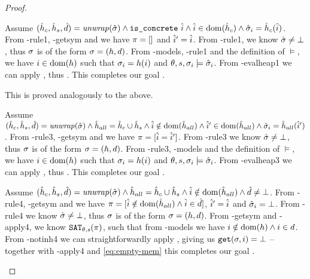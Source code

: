 \begin{proof}
\begin{hypvlist}
 Assume $(\hat{h}_c,\hat{h}_s,\hat{d})=\mathit{unwrap}(\hat{\sigma}) \land \texttt{is\_concrete}~\hat{i} \land \hat{i}\in\operatorname{dom}(\hat{h}_c) \land \hat{\sigma}_{i}=\hat{h}_c(\hat{i})$.
 From \hyp{rule1}, \hyp{getsym} and  we have $\pi=[]$ and $\hat{i}'=\hat{i}$.
 From \hyp{rule1}, we know $\hat{\sigma}\neq\bot$, thus $\sigma$ is of the form $\sigma=(h,d)$.
 From \hyp{models}, \hyp{rule1} and the definition of $\models$, we have $i\in \operatorname{dom}(h)$ such that $\sigma_i=h(i)$ and ${\theta,s,\sigma_i\models\hat{\sigma}_i}$.
 From \hyp{evalheap1} we can apply , thus . This completes our goal .
\end{hypvlist}

 This is proved analogously to the above.


\begin{hypvlist}
 Assume $(\hat{h}_c,\hat{h}_s,\hat{d})=\mathit{unwrap}(\hat{\sigma}) \land \hat{h}_{all}=\hat{h}_c\cup \hat{h}_s \land \hat{i}\notin \operatorname{dom}(\hat{h}_{all}) \land \hat{i}'\in\operatorname{dom}(\hat{h}_{all}) \land {\hat{\sigma}_i=\hat{h}_{all}(\hat{i}')}$.
 From \hyp{rule3}, \hyp{getsym} and  we have $\pi=[\hat{i} = \hat{i}']$.
 From \hyp{rule3} we know $\hat{\sigma}\neq\bot$, thus $\sigma$ is of the form $\sigma=(h,d)$.
 From \hyp{rule3}, \hyp{models} and the definition of $\models$, we have $i\in \operatorname{dom}(h)$  such that $\sigma_i=h(i)$ and ${\theta,s,\sigma_i\models\hat{\sigma}_i}$.
 From \hyp{evalheap3} we can apply , thus . This completes our goal .
\end{hypvlist}


\begin{hypvlist}
 Assume $(\hat{h}_c,\hat{h}_s,\hat{d})=\mathit{unwrap}(\hat{\sigma}) \land \hat{h}_{all}=\hat{h}_c\cup \hat{h}_s \land \hat{i}\notin\operatorname{dom}(\hat{h}_{all}) \land \hat{d}\neq\bot$.
 From \hyp{rule4}, \hyp{getsym} and  we have $\pi=[\hat{i}\notin\operatorname{dom}(\hat{h}_{all}) \land \hat{i}\in \hat{d}]$, $\hat{i}'=\hat{i}$ and $\hat{\sigma}_i=\bot$.
 From \hyp{rule4} we know $\hat{\sigma}\neq\bot$, thus $\sigma$ is of the form $\sigma=(h,d)$.
 From \hyp{getsym} and \hyp{apply4}, we know $\texttt{SAT}_{\mathit{\theta,s}}(\pi)$, such that from \hyp{models} we have ${i\notin \operatorname{dom}(h)} \land {i\in d}$.
 From \hyp{notinh4} we can straightforwardly apply , giving us $\texttt{get}(\sigma,i)=\bot$ -- together with \hyp{apply4} and \ref{eq:empty-mem} this completes our goal .
\end{hypvlist}


\end{proof}
